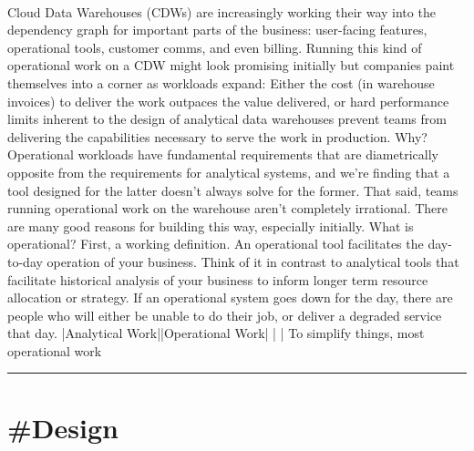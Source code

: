 \documentclass[10pt,a4paper]{article}
\begin{document}
\begin{multicols*}{2}
\paragraph{}
Cloud Data Warehouses (CDWs) are increasingly working their way into the dependency graph for important parts of the business: user-facing features, operational tools, customer comms, and even billing. Running this kind of operational work on a CDW might look promising initially but companies paint themselves into a corner as workloads expand: Either the cost (in warehouse invoices) to deliver the work outpaces the value delivered, or hard performance limits inherent to the design of analytical data warehouses prevent teams from delivering the capabilities necessary to serve the work in production.
Why? Operational workloads have fundamental requirements that are diametrically opposite from the requirements for analytical systems, and we’re finding that a tool designed for the latter doesn’t always solve for the former. That said, teams running operational work on the warehouse aren’t completely irrational. There are many good reasons for building this way, especially initially.
What is operational?
First, a working definition. An operational tool facilitates the day-to-day operation of your business. Think of it in contrast to analytical tools that facilitate historical analysis of your business to inform longer term resource allocation or strategy. If an operational system goes down for the day, there are people who will either be unable to do their job, or deliver a degraded service that day.
|Analytical Work||Operational Work|
|
|
To simplify things, most operational work
\par\noindent\textcolor{red}{\rule{\linewidth}{0.2mm}}
\vfill
\null
\end{multicols*}

\newpage
\section{\#Design}
\end{document}
